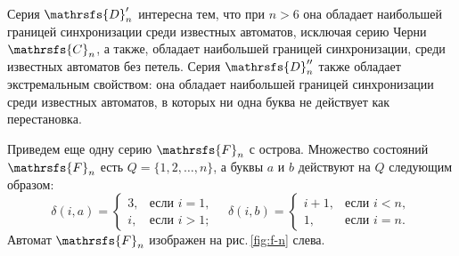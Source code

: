 \documentclass[11pt]{article}
\newcommand{\sa}{synchronizing automata}
\begin{document}
Серия $\mathrsfs{D}'_n$ интересна тем, что при $n>6$ она обладает
наибольшей границей синхронизации среди известных автоматов, исключая серию
Черни $\mathrsfs{C}_n$, а также, обладает наибольшей границей синхронизации, среди
известных автоматов без петель. Серия $\mathrsfs{D}''_n$ также обладает экстремальным
свойством: она обладает наибольшей границей синхронизации среди известных автоматов, в 
которых ни одна буква не действует как перестановка.


Приведем еще одну серию $\mathrsfs{F}_n$ с острова. 
Множество состояний $\mathrsfs{F}_n$ есть $Q=\{1,2,\dots,n\}$,
а буквы $a$ и $b$ действуют на $Q$ следующим образом:
$$\delta(i,a)=\begin{cases}
3, &\text{если } i = 1,\\
i, &\text{если } i>1;
\end{cases}\quad
\delta(i,b)=\begin{cases}
i+1, &\text{если } i<n,\\
1, &\text{если } i=n.
\end{cases}$$
Автомат $\mathrsfs{F}_n$ изображен на рис.\,\ref{fig:f-n} слева.
\end{document}

